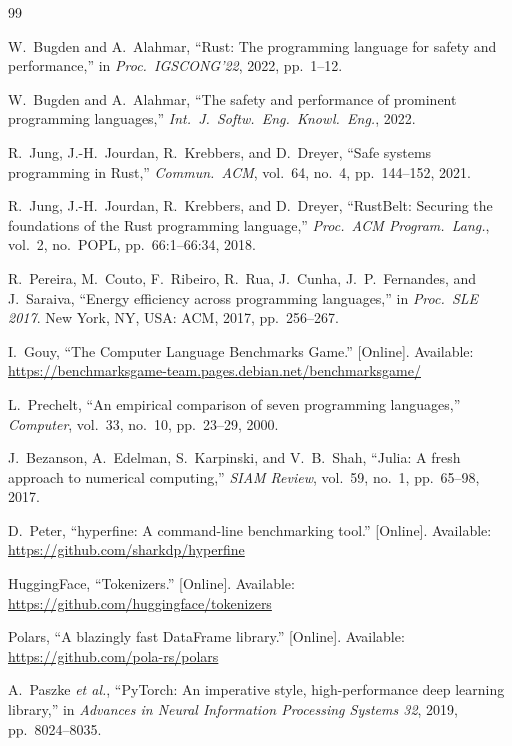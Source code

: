 \documentclass[10pt,conference]{IEEEtran}
\begin{document}
\begin{thebibliography}{99}

W.~Bugden and A.~Alahmar, ``Rust: The programming language for
safety and performance,'' in \emph{Proc.\ IGSCONG'22}, 2022,
pp.~1--12.

W.~Bugden and A.~Alahmar, ``The safety and performance of
prominent programming languages,'' \emph{Int.\ J.\ Softw.\ Eng.\
Knowl.\ Eng.}, 2022.

R.~Jung, J.-H.\ Jourdan, R.~Krebbers, and D.~Dreyer, ``Safe
systems programming in Rust,'' \emph{Commun.\ ACM}, vol.~64,
no.~4, pp.~144--152, 2021.

R.~Jung, J.-H.\ Jourdan, R.~Krebbers, and D.~Dreyer, ``RustBelt:
Securing the foundations of the Rust programming language,''
\emph{Proc.\ ACM Program.\ Lang.}, vol.~2, no.~POPL, pp.~66:1--66:34,
2018.

R.~Pereira, M.~Couto, F.~Ribeiro, R.~Rua, J.~Cunha, J.~P.\ Fernandes,
and J.~Saraiva, ``Energy efficiency across programming languages,''
in \emph{Proc.\ SLE 2017}. New York, NY, USA: ACM, 2017,
pp.~256--267.

I.~Gouy, ``The Computer Language Benchmarks Game.'' [Online].
Available:
\url{https://benchmarksgame-team.pages.debian.net/benchmarksgame/}

L.~Prechelt, ``An empirical comparison of seven programming
languages,'' \emph{Computer}, vol.~33, no.~10, pp.~23--29, 2000.

J.~Bezanson, A.~Edelman, S.~Karpinski, and V.~B.\ Shah, ``Julia:
A fresh approach to numerical computing,'' \emph{SIAM Review},
vol.~59, no.~1, pp.~65--98, 2017.

D.~Peter, ``hyperfine: A command-line benchmarking tool.''
[Online]. Available: \url{https://github.com/sharkdp/hyperfine}

HuggingFace, ``Tokenizers.'' [Online]. Available:
\url{https://github.com/huggingface/tokenizers}

Polars, ``A blazingly fast DataFrame library.'' [Online].
Available: \url{https://github.com/pola-rs/polars}

A.~Paszke \emph{et al.}, ``PyTorch: An imperative style,
high-performance deep learning library,'' in \emph{Advances in
Neural Information Processing Systems 32}, 2019, pp.~8024--8035.


\end{thebibliography}
\end{document}
